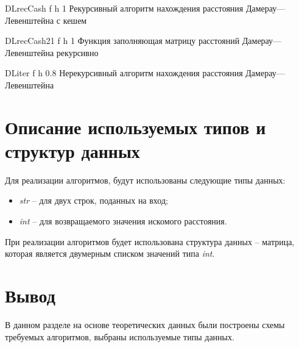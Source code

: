 {DLrecCash} %
{f} %
{h} %
{1\textwidth} %
{Рекурсивный алгоритм нахождения расстояния Дамерау---Левенштейна с кешем} %

{DLrecCash21} %
{f} %
{h} %
{1\textwidth} %
{Функция заполняющая матрицу расстояний Дамерау---Левенштейна рекурсивно} %


{DLiter} %
{f} %
{h} %
{0.8\textwidth} %
{Нерекурсивный алгоритм нахождения расстояния Дамерау---Левенштейна} %


\section{Описание используемых типов и структур данных}

Для реализации алгоритмов, будут использованы следующие типы данных:
\begin{itemize}
	\item \textit{str} -- для двух строк, поданных на вход;
	\item \textit{int} -- для возвращаемого значения искомого расстояния.
\end{itemize}

При реализации алгоритмов будет использована структура данных -- матрица, которая является двумерным списком значений типа \textit{int}.


\section*{Вывод}

В данном разделе на основе теоретических данных были построены схемы требуемых алгоритмов, выбраны используемые типы данных.
